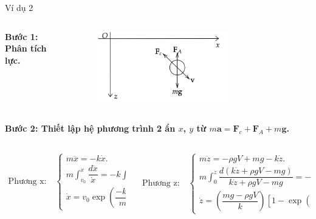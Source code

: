 \begin{frame}{Ví dụ 2}
\begin{columns}
    \begin{column}{0.5\textwidth}
\textbf{Bước 1: Phân tích lực.}
\end{column}
    \begin{column}{0.5\textwidth}  
\begin{figure}
    \centering
    \includegraphics[width=0.7\textwidth]{Slides/Figure/masatnhot1.png}
\end{figure}
\end{column}
\end{columns}
\textbf{Bước 2: Thiết lập hệ phương trình 2 ẩn \(x\), \(y\) từ \(m\mathbf a=\mathbf F_c+\mathbf F_A+m\mathbf g\).}
\scriptsize
\begin{columns}
\begin{column}{0.5\textwidth}
\begin{align*}
    \text{Phương x:}\quad
    \begin{cases}
    m\ddot{x} = -k\dot{x}. \\
    m\int_{v_0}^{\dot{x}} \dfrac{d\dot x}{\dot x} = -k\int_0^t dt. \\
    \dot x=v_0 \exp(\dfrac{-kt}{m}).
    \end{cases}
\end{align*}
\end{column}
\begin{column}{0.5\textwidth}
\begin{align*}
    \text{Phương z:}\quad
    \begin{cases}    
    m\ddot{z} = -\rho g V + mg - k\dot{z}. \\
    m\int_{0}^{\dot z} \dfrac{d(k\dot z+\rho g V-mg)}{k\dot z+\rho g V-mg} =-k\int_0^t dt.\\
    \dot{z} = \left(\dfrac{mg - \rho g V}{k}\right)\left[1 - \exp\left(-\frac{k t}{m}\right)\right]
    \end{cases}
\end{align*}
\end{column}
\end{columns}
\normalsize
\end{frame}

